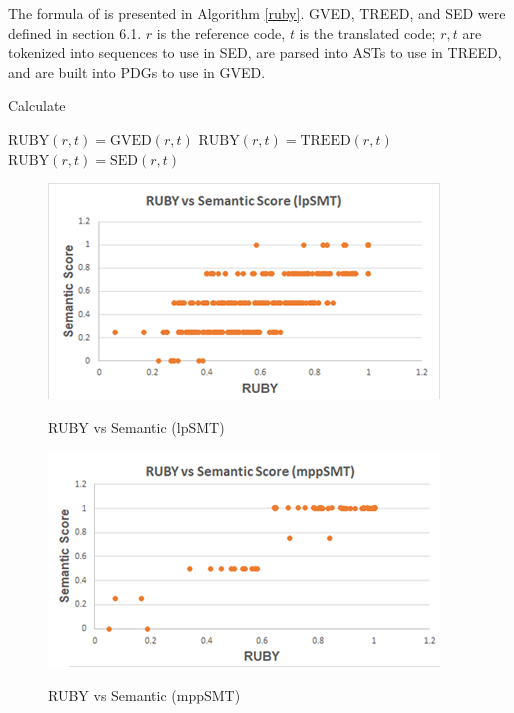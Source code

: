 The formula of {\model} is presented in Algorithm \ref{ruby}. GVED, TREED, and SED were defined in section 6.1. $r$ is the reference code, $t$ is the translated code; $r,t$ are tokenized into sequences to use in SED, are parsed into ASTs to use in TREED, and are built into PDGs to use in GVED.  
\makeatletter
\def\BState{\State\hskip-\ALG@thistlm}
\makeatother
\begin{algorithm}
\caption{Calculate {\model}}\label{ruby}
\begin{algorithmic}[1]
\State $\mbox{RUBY}\left(r,t\right) = \mbox{GVED}\left(r,t\right) $
\State $\mbox{RUBY}\left(r,t\right) = \mbox{TREED}\left(r,t\right) $
\Else 
\State $\mbox{RUBY}\left(r,t\right) = \mbox{SED}\left(r,t\right) $
\EndIf
\end{algorithmic}
\end{algorithm}



\begin{figure}
\caption{RUBY vs Semantic (lpSMT)}
\centering
\includegraphics{img/rubyvssem_lpSMT.png}
\label{fig:RubySemlpSMT}
\end{figure}

\begin{figure}
\caption{RUBY vs Semantic (mppSMT)}
\centering
\includegraphics{img/rubyvssem_mppSMT.png}
\label{fig:RubySemMppSMT}
\end{figure}

